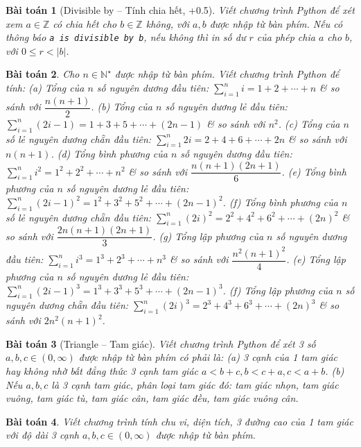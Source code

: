 \documentclass{article}
\newtheorem{baitoan}{Bài toán}
\begin{document}
\begin{baitoan}[Divisible by -- Tính chia hết, +0.5]
	Viết chương trình Python để xét xem $a\in\mathbb{Z}$ có chia hết cho $b\in\mathbb{Z}$ không, với $a,b$ được nhập từ bàn phím. Nếu có thông báo {\tt a is divisible by b}, nếu không thì in số dư $r$ của phép chia $a$ cho $b$, với $0\le r < |b|$.
\end{baitoan}

\begin{baitoan}
	Cho $n\in\mathbb{N}^\star$ được nhập từ bàn phím. Viết chương trình Python để tính: (a) Tổng của $n$ số nguyên dương đầu tiên: $\sum_{i=1}^n i = 1 + 2 + \cdots + n$ \& so sánh với $\dfrac{n(n + 1)}{2}$. (b) Tổng của $n$ số nguyên dương lẻ đầu tiên: $\sum_{i=1}^n (2i - 1) = 1 + 3 + 5 + \cdots + (2n - 1)$  \& so sánh với $n^2$. (c) Tổng của $n$ số lẻ nguyên dương chẵn đầu tiên: $\sum_{i=1}^n 2i = 2 + 4 + 6 + \cdots + 2n$ \& so sánh với $n(n + 1)$. (d) Tổng bình phương của $n$ số nguyên dương đầu tiên: $\sum_{i=1}^n i^2 = 1^2 + 2^2 + \cdots + n^2$ \& so sánh với $\dfrac{n(n + 1)(2n + 1)}{6}$. (e) Tổng bình phương của $n$ số nguyên dương lẻ đầu tiên: $\sum_{i=1}^n (2i - 1)^2 = 1^2 + 3^2 + 5^2 + \cdots + (2n - 1)^2$. (f) Tổng bình phương của $n$ số lẻ nguyên dương chẵn đầu tiên: $\sum_{i=1}^n (2i)^2 = 2^2 + 4^2 + 6^2 + \cdots + (2n)^2$ \& so sánh với $\dfrac{2n(n + 1)(2n + 1)}{3}$. (g) Tổng lập phương của $n$ số nguyên dương đầu tiên: $\sum_{i=1}^n i^3 = 1^3 + 2^3 + \cdots + n^3$ \& so sánh với $\dfrac{n^2(n + 1)^2}{4}$. (e) Tổng lập phương của $n$ số nguyên dương lẻ đầu tiên: $\sum_{i=1}^n (2i - 1)^3 = 1^3 + 3^3 + 5^3 + \cdots + (2n - 1)^3$. (f) Tổng lập phương của $n$ số nguyên dương chẵn đầu tiên: $\sum_{i=1}^n (2i)^3 = 2^3 + 4^3 + 6^3 + \cdots + (2n)^3$ \& so sánh với $2n^2(n + 1)^2$.
\end{baitoan}

\begin{baitoan}[Triangle -- Tam giác]
	 Viết chương trình Python để xét 3 số $a,b,c\in(0,\infty)$ được nhập từ bàn phím có phải là: (a) 3 cạnh của 1 tam giác hay không nhờ bất đẳng thức 3 cạnh tam giác $a < b + c,b < c + a,c < a + b$. (b) Nếu $a,b,c$ là 3 cạnh tam giác, phân loại tam giác đó: tam giác nhọn, tam giác vuông, tam giác tù, tam giác cân, tam giác đều, tam giác vuông cân.
\end{baitoan}

\begin{baitoan}
	Viết chương trình tính chu vi, diện tích, 3 đường cao của 1 tam giác với độ dài 3 cạnh $a,b,c\in(0,\infty)$ được nhập từ bàn phím.
\end{baitoan}
\end{document}
